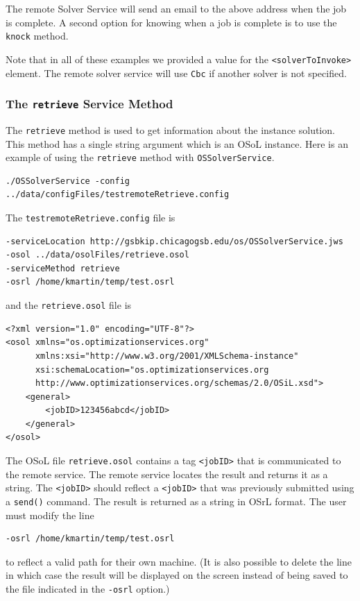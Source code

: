 \documentclass[11pt]{article}
\renewcommand{\_}{{\char"5F}}
\renewcommand{\{}{{\char"7B}}
\renewcommand{\}}{{\char"7D}}
\renewcommand{\^}{{\char"0D}}
\renewcommand{\'}{{\char"0D}}
\begin{document}
\begin{enumerate}[Step 1:]
The remote Solver Service will send an email to the above address when the job is complete. A second option for
knowing when a job is complete is to use the {\tt knock} method.

Note that in all of these examples we provided a value for the {\tt <solverToInvoke>} element.
The remote solver service will use {\tt Cbc} if another solver is not specified.%



\subsubsection{The  {\tt retrieve} Service Method}\label{section:retrieve}

The {\tt retrieve} method is used to get information about the instance solution.  This method has a single string argument which is an OSoL instance. Here is an example of using the {\tt retrieve} method with {\tt OSSolverService}.
\begin{verbatim}
./OSSolverService -config ../data/configFiles/testremoteRetrieve.config
\end{verbatim}
The {\tt testremoteRetrieve.config} file is
\begin{verbatim}
-serviceLocation http://gsbkip.chicagogsb.edu/os/OSSolverService.jws
-osol ../data/osolFiles/retrieve.osol
-serviceMethod retrieve
-osrl /home/kmartin/temp/test.osrl
\end{verbatim}
and the {\tt retrieve.osol} file is

\begin{verbatim}
<?xml version="1.0" encoding="UTF-8"?>
<osol xmlns="os.optimizationservices.org"
      xmlns:xsi="http://www.w3.org/2001/XMLSchema-instance"
      xsi:schemaLocation="os.optimizationservices.org
      http://www.optimizationservices.org/schemas/2.0/OSiL.xsd">
    <general>
        <jobID>123456abcd</jobID>
    </general>
</osol>
\end{verbatim}

The OSoL file {\tt retrieve.osol} contains a tag {\tt <jobID>} that is communicated to
the remote service. The remote service locates the result and returns it as a string.
The {\tt <jobID>} should reflect a {\tt <jobID>} that was previously submitted
using a {\tt send()} command.
The result is returned as a string in OSrL format.  The user must modify the line
\begin{verbatim}
-osrl /home/kmartin/temp/test.osrl
\end{verbatim}
to reflect a valid path for their own machine.  (It is also possible to delete the line
in which case the result will be displayed on the screen instead of being saved to the
file indicated in the {\tt -osrl} option.)



\end{enumerate}
\end{document}
